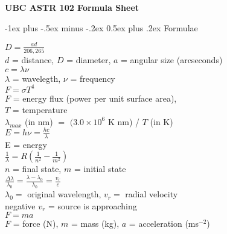 \documentclass[10pt,landscape]{article}
\makeatletter
\renewcommand{\section}{\@startsection{section}{1}{0mm}%
                                {-1ex plus -.5ex minus -.2ex}%
                                {0.5ex plus .2ex}%
                                {\normalfont\large\bfseries}}
\makeatother
\begin{document}
\raggedright
\footnotesize
\begin{multicols}{3}


\setlength{\premulticols}{1pt}
\setlength{\postmulticols}{1pt}
\setlength{\multicolsep}{1pt}
\setlength{\columnsep}{2pt}

\begin{center}
     \Large{\textbf{UBC ASTR 102 Formula Sheet}} \\
\end{center}

\section{Formulae}

$D = \frac{ad}{206,265}$ \\
$d$ = distance, $D$ = diameter,  $a$ = angular size (arcseconds) \\ 

$c = \lambda \nu$ \\ 
$\lambda$ = wavelegth, $\nu$ = frequency \\

$F = \sigma T^4$ \\
$F$ = energy flux (power per unit surface area), \\$T$ = temperature \\

$\lambda_{max}$ (in nm) $=$ $(3.0 \times 10^6$ K nm) / $T$ (in K) \\

$E = h\nu = \frac{hc}{\lambda}$ \\
E = energy \\

$\frac{1}{\lambda} = R \left ( \frac{1}{n^2} - \frac{1}{m^2}\right )$ \\
$n$ = final state, $m$ = initial state \\

$\frac{\Delta\lambda}{\lambda_0} = \frac{\lambda - \lambda_0}{\lambda_0} = \frac{v_r}{c}$\\
$\lambda_0 =$ original wavelength, $v_r =$ radial velocity\\
negative $v_r$ = source is approaching\\

$F = ma$ \\
$F$ = force (N), $m$ = mass (kg), $a$ = acceleration (ms$^{-2}$)\\


\end{multicols}
\end{document}
